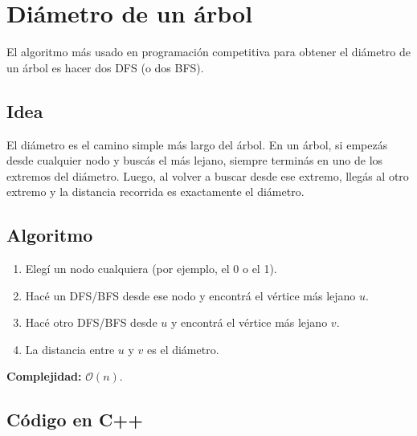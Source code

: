 \section{Diámetro de un árbol}

El algoritmo más usado en programación competitiva para obtener el diámetro de un árbol es hacer dos DFS (o dos BFS).

\subsection*{Idea}

El diámetro es el camino simple más largo del árbol. En un árbol, si empezás desde cualquier nodo y buscás el más lejano, siempre terminás en uno de los extremos del diámetro. Luego, al volver a buscar desde ese extremo, llegás al otro extremo y la distancia recorrida es exactamente el diámetro.

\subsection*{Algoritmo}

\begin{enumerate}
	\item Elegí un nodo cualquiera (por ejemplo, el 0 o el 1).
	\item Hacé un DFS/BFS desde ese nodo y encontrá el vértice más lejano $u$.
	\item Hacé otro DFS/BFS desde $u$ y encontrá el vértice más lejano $v$.
	\item La distancia entre $u$ y $v$ es el diámetro.
\end{enumerate}

\textbf{Complejidad:} $\mathcal{O}(n)$.

\subsection*{Código en C++}

